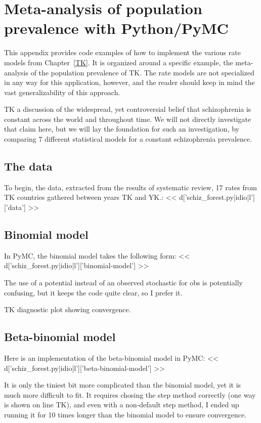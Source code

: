 \section{Meta-analysis of population prevalence with Python/PyMC}

This appendix provides code examples of how to implement the various
rate models from Chapter~\ref{TK}.  It is organized around a specific
example, the meta-analysis of the population prevalence of TK.  The
rate models are not specialized in any way for this application,
however, and the reader should keep in mind the vast generalizability
of this approach.

TK a discussion of the widespread, yet controversial belief that
schizophrenia is constant across the world and throughout time.  We
will not directly investigate that claim here, but we will lay the
foundation for such an investigation, by comparing 7 different
statistical models for a constant schizophrenia prevalence.

\subsection{The data}
To begin, the data, extracted from the results of systematic review,
17 rates from TK countries gathered between years TK and YK.:
<< d['schiz_forest.py|idio|l']['data'] >>

\subsection{Binomial model}
In PyMC, the binomial model takes the following form:
<< d['schiz_forest.py|idio|l']['binomial-model'] >>

The use of a potential instead of an observed stochastic for obs is potentially
confusing, but it keeps the code quite clear, so I prefer it.

TK diagnostic plot showing convergence.

\subsection{Beta-binomial model}
Here is an implementation of the beta-binomial model in PyMC:
<< d['schiz_forest.py|idio|l']['beta-binomial-model'] >>

It is only the tiniest bit more complicated than the binomial model,
yet it is much more difficult to fit.  It requires chosing the step
method correctly (one way is shown on line TK), and even with a
non-default step method, I ended up running it for 10 times longer
than the binomial model to ensure convergence.

